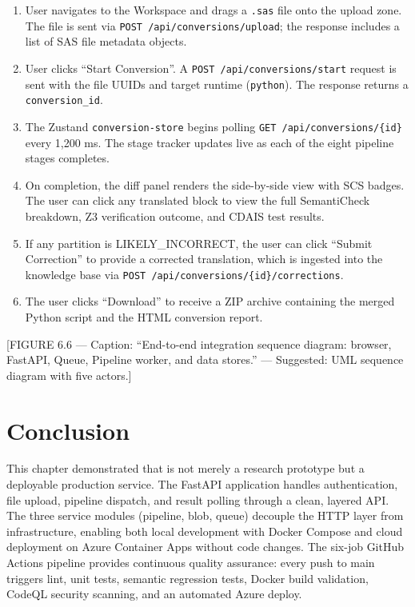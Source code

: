 \begin{enumerate}
  \item User navigates to the Workspace and drags a \texttt{.sas} file onto
    the upload zone. The file is sent via \texttt{POST /api/conversions/upload};
    the response includes a list of SAS file metadata objects.
  \item User clicks ``Start Conversion''. A \texttt{POST /api/conversions/start}
    request is sent with the file UUIDs and target runtime (\texttt{python}).
    The response returns a \texttt{conversion\_id}.
  \item The Zustand \texttt{conversion-store} begins polling
    \texttt{GET /api/conversions/\{id\}} every 1,200 ms. The stage tracker
    updates live as each of the eight pipeline stages completes.
  \item On completion, the diff panel renders the side-by-side view with SCS
    badges. The user can click any translated block to view the full
    SemantiCheck breakdown, Z3 verification outcome, and CDAIS test results.
  \item If any partition is LIKELY\_INCORRECT, the user can click ``Submit
    Correction'' to provide a corrected translation, which is ingested into
    the knowledge base via \texttt{POST /api/conversions/\{id\}/corrections}.
  \item The user clicks ``Download'' to receive a ZIP archive containing the
    merged Python script and the HTML conversion report.
\end{enumerate}

[FIGURE 6.6 --- Caption: ``End-to-end integration sequence diagram: browser,
FastAPI, Queue, Pipeline worker, and data stores.'' --- Suggested: UML
sequence diagram with five actors.]

\section{Conclusion}
\label{sec:ch6-conclusion}

This chapter demonstrated that \codara{} is not merely a research prototype
but a deployable production service. The FastAPI application handles
authentication, file upload, pipeline dispatch, and result polling through a
clean, layered API. The three service modules (pipeline, blob, queue) decouple
the HTTP layer from infrastructure, enabling both local development with
Docker Compose and cloud deployment on Azure Container Apps without code changes.
The six-job GitHub Actions pipeline provides continuous quality assurance:
every push to main triggers lint, unit tests, semantic regression tests,
Docker build validation, CodeQL security scanning, and an automated Azure deploy.

